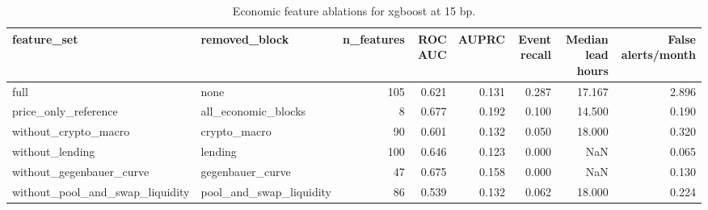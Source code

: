 \begin{table}
\caption{Economic feature ablations for xgboost at 15 bp.}
\label{tab:ablation_15_xgboost}
\begin{tabular}{llrrrrrr}
\toprule
feature\_set & removed\_block & n\_features & ROC AUC & AUPRC & Event recall & Median lead hours & False alerts/month \\
\midrule
full & none & 105 & 0.621 & 0.131 & 0.287 & 17.167 & 2.896 \\
price\_only\_reference & all\_economic\_blocks & 8 & 0.677 & 0.192 & 0.100 & 14.500 & 0.190 \\
without\_crypto\_macro & crypto\_macro & 90 & 0.601 & 0.132 & 0.050 & 18.000 & 0.320 \\
without\_lending & lending & 100 & 0.646 & 0.123 & 0.000 & NaN & 0.065 \\
without\_gegenbauer\_curve & gegenbauer\_curve & 47 & 0.675 & 0.158 & 0.000 & NaN & 0.130 \\
without\_pool\_and\_swap\_liquidity & pool\_and\_swap\_liquidity & 86 & 0.539 & 0.132 & 0.062 & 18.000 & 0.224 \\
\bottomrule
\end{tabular}
\end{table}
